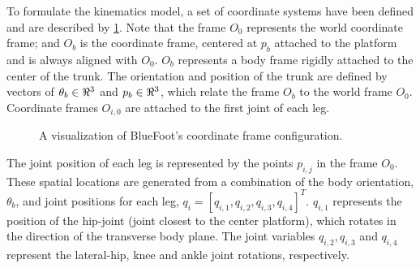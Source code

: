 			To formulate the kinematics model, a set of coordinate systems have been defined and are described by \ref{fig::coordinate_frames}. Note that the frame $O_{0}$ represents the world coordinate frame; and $O_{b}$ is the coordinate frame, centered at  ${p}_{b}$ attached to the platform and is always aligned with $O_{0}$. $O_{b}$ represents a body frame rigidly attached to the center of the trunk. The orientation and position of the trunk are defined by vectors of $\theta_{b}\in\Re^{3}$ and ${p}_{b}\in\Re^{3}$, which relate the frame $O_{b}$ to the world frame $O_{0}$. Coordinate frames $O_{i,0}$ are attached to the first joint of each \Ith leg.
%
				\begin{figure}[h!]
					\centering
					\caption{A visualization of BlueFoot's coordinate frame configuration.}
					\label{fig::coordinate_frames}
				\end{figure}
%
			The \Jth joint position of each \Ith leg is represented  by the points ${p}_{i,j}$ in the frame $O_{0}$. These spatial locations are generated from a combination of the body orientation, $\theta_{b}$, and joint positions for each \Ith leg, $q_{i} = [q_{i,1}, q_{i,2}, q_{i,3}, q_{i,4}]^T$. $q_{i,1}$ represents the position of the hip-joint (joint closest to the center platform), which rotates in the direction of the transverse body plane. The joint variables $q_{i,2}, q_{i,3}$ and $q_{i,4}$ represent the lateral-hip, knee and ankle joint rotations, respectively.

